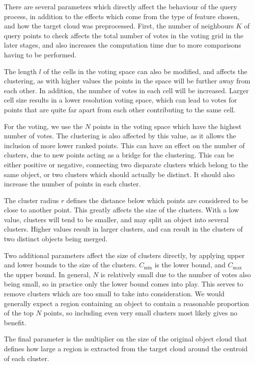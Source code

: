 \documentclass[11pt,a4paper]{kth-mag}
\begin{document}
There are several parameters which directly affect the behaviour of the query
process, in addition to the effects which come from the type of feature chosen,
and how the target cloud was preprocessed. First, the number of neighbours $K$
of query points to check affects the total number of votes in the voting grid in
the later stages, and also increases the computation time due to more
comparisons having to be performed.

The length $l$ of the cells in the voting space can also be modified, and
affects the clustering, as with higher values the points in the space will be
further away from each other. In addition, the number of votes in each cell will
be increased. Larger cell size results in a lower resolution voting space, which
can lead to votes for points that are quite far apart from each other
contributing to the same cell.

For the voting, we use the $N$ points in the voting space which have the highest
number of votes. The clustering is also affected by this value, as it allows the
inclusion of more lower ranked points. This can have an effect on the number of
clusters, due to new points acting as a bridge for the clustering. This can be
either positive or negative, connecting two disparate clusters which belong to
the same object, or two clusters which should actually be distinct. It should
also increase the number of points in each cluster.

The cluster radius $r$ defines the distance below which points are considered to
be close to another point. This greatly affects the size of the clusters. With a
low value, clusters will tend to be smaller, and may split an object into
several clusters. Higher values result in larger clusters, and can result in the
clusters of two distinct objects being merged.

Two additional parameters affect the size of clusters directly, by applying
upper and lower bounds to the size of the clusters. $C_{\min}$ is the lower
bound, and $C_{\max}$ the upper bound. In general, $N$ is relatively small due
to the number of votes also being small, so in practice only the lower bound
comes into play. This serves to remove clusters which are too small to take into
consideration. We would generally expect a region containing an object to
contain a reasonable proportion of the top $N$ points, so including even very
small clusters most likely gives no benefit.

The final parameter is the multiplier on the size of the original object cloud
that defines how large a region is extracted from the target cloud around the
centroid of each cluster.
\end{document}
